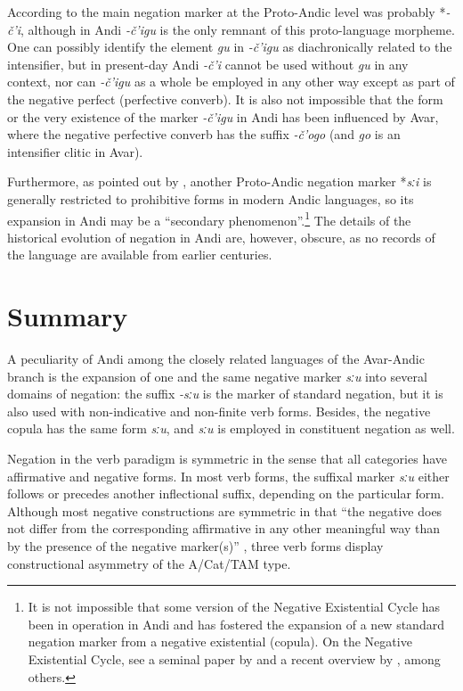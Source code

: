 \documentclass[output=paper,colorlinks=true, citecolor=brown]{langscibook}
\begin{document}
According to \citet[119]{Alekseev1988} the main negation marker at the Proto-Andic level was probably *\textit{\nobreakdash-č’i}, although in Andi \textit{\nobreakdash-č’igu} is the only remnant of this proto-language morpheme. One can possibly identify the element \textit{gu} in \textit{\nobreakdash-č’igu} as diachronically related to the intensifier, but in present-day Andi \textit{\nobreakdash-č’i} cannot be used without \textit{gu} in any context, nor can \textit{\nobreakdash-č’igu} as a whole be employed in any other way except as part of the negative perfect (perfective converb). It is also not impossible that the form or the very existence of the marker \textit{\nobreakdash-č’igu} in Andi has been influenced by Avar, where the negative perfective converb has the suffix \textit{\nobreakdash-č’ogo} (and \textit{go} is an intensifier clitic in Avar).

Furthermore, as pointed out by \citet[119]{Alekseev1988}, another Proto-Andic negation marker *\textit{sːi} is generally restricted to prohibitive forms in modern Andic languages, so its expansion in Andi may be a “secondary phenomenon”.\footnote{It is not impossible that some version of the Negative Existential Cycle has been in operation in Andi and has fostered the expansion of a new standard negation marker from a negative existential (copula). On the Negative Existential Cycle, see a seminal paper by \citet{Croft1991} and a recent overview by \citet{VeselinovaHamari2022intro}, among others.} The details of the historical evolution of negation in Andi are, however, obscure, as no records of the language are available from earlier centuries.

\section{Summary} \label{sec:and:5}

A peculiarity of Andi among the closely related languages of the Avar-Andic branch is the expansion of one and the same negative marker \textit{sːu} into several domains of negation: the suffix \textit{{}-sːu} is the marker of standard negation, but it is also used with non-indicative and non-finite verb forms. Besides, the negative copula has the same form \textit{sːu}, and \textit{sːu} is employed in constituent negation as well.

Negation in the verb paradigm is symmetric in the sense that all categories have affirmative and negative forms. In most verb forms, the suffixal marker \textit{sːu} either follows or precedes another inflectional suffix, depending on the particular form. Although most negative constructions are symmetric in that “the negative does not differ from the corresponding affirmative in any other meaningful way than by the presence of the negative marker(s)” \citep[61]{Miestamo2005}, three verb forms display constructional asymmetry of the A/Cat/TAM type.
\end{document}
